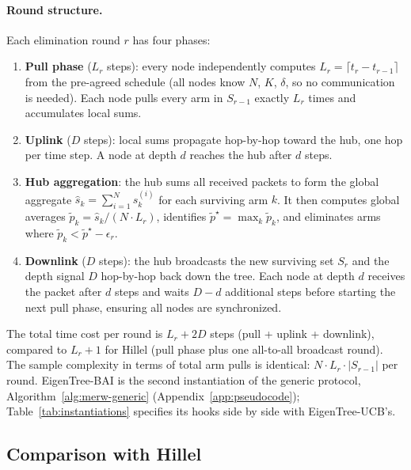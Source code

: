 \documentclass{article}
\newcommand{\merw}{EigenTree}
\begin{document}
\paragraph{Round structure.} Each elimination round $r$ has four phases:

\begin{enumerate}
    \item \textbf{Pull phase} ($L_r$ steps): every node independently computes $L_r = \lceil t_r - t_{r-1} \rceil$ from the pre-agreed schedule (all nodes know $N$, $K$, $\delta$, so no communication is needed). Each node pulls every arm in $S_{r-1}$ exactly $L_r$ times and accumulates local sums.

    \item \textbf{Uplink} ($D$ steps): local sums propagate hop-by-hop toward the hub, one hop per time step. A node at depth $d$ reaches the hub after $d$ steps.

    \item \textbf{Hub aggregation}: the hub sums all received packets to form the global aggregate $\hat{s}_k = \sum_{i=1}^N s_k^{(i)}$ for each surviving arm $k$. It then computes global averages $\tilde{p}_k = \hat{s}_k / (N \cdot L_r)$, identifies $\tilde{p}^\star = \max_k \tilde{p}_k$, and eliminates arms where $\tilde{p}_k < \tilde{p}^\star - \epsilon_r$.

    \item \textbf{Downlink} ($D$ steps): the hub broadcasts the new surviving set $S_r$ and the depth signal $D$ hop-by-hop back down the tree. Each node at depth $d$ receives the packet after $d$ steps and waits $D - d$ additional steps before starting the next pull phase, ensuring all nodes are synchronized.
\end{enumerate}

The total time cost per round is $L_r + 2D$ steps (pull + uplink + downlink), compared to $L_r + 1$ for Hillel (pull phase plus one all-to-all broadcast round). The sample complexity in terms of total arm pulls is identical: $N \cdot L_r \cdot |S_{r-1}|$ per round. \merw-BAI is the second instantiation of the generic protocol, Algorithm~\ref{alg:merw-generic} (Appendix~\ref{app:pseudocode}); Table~\ref{tab:instantiations} specifies its hooks side by side with \merw-UCB's.

\subsection{Comparison with Hillel}
\end{document}
